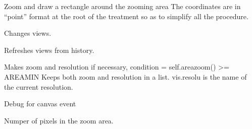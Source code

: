 \documentclass[letterpaper,10pt,openany,oneside]{sphinxmanual}
\begin{document}
\begin{fulllineitems}
\label{rst/visu2d:Visu.zooming.ZOOMING}
Zoom and draw a rectangle around the zooming area
The coordinates are in ``point'' format at the root of the treatment
so as to simplify all the procedure.

\begin{fulllineitems}
\label{rst/visu2d:Visu.zooming.ZOOMING.change_view}
Changes views.

\end{fulllineitems}


\begin{fulllineitems}
\label{rst/visu2d:Visu.zooming.ZOOMING.change_view_from_list}
Refreshes views from history.

\end{fulllineitems}


\begin{fulllineitems}
\label{rst/visu2d:Visu.zooming.ZOOMING.change_zoom}
Makes zoom and resolution if necessary, condition = self.areazoom() \textgreater{}= AREAMIN
Keeps both zoom and resolution in a list.
vis.resolu is the name of the current resolution.

\end{fulllineitems}


\begin{fulllineitems}
\label{rst/visu2d:Visu.zooming.ZOOMING.debug_trig}
Debug for canvas event

\end{fulllineitems}


\begin{fulllineitems}
\label{rst/visu2d:Visu.zooming.ZOOMING.find_numbpix}
Numper of pixels in the zoom area.


\end{fulllineitems}
\end{fulllineitems}
\end{document}
